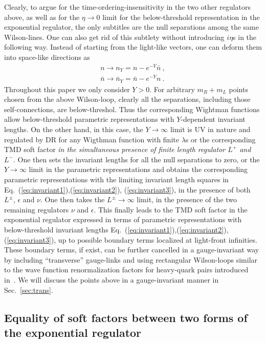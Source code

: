 \documentclass[a4paper,11pt]{article}
\begin{document}
Clearly, to argue for the time-ordering-insensitivity in the two other regulators above, as well as for the $\eta\rightarrow 0$ limit for the below-threshold representation in the exponential regulator, the only subtitles are the null separations among the same Wilson-lines. One can also get rid of this subtlety without introducing $i\eta$s in the following way. Instead of starting from the light-like vectors, one can deform them into space-like directions as~\cite{Collins:2004nx,Collins:2011zzd}
\begin{align}
n\rightarrow n_Y=n-e^{-Y}\bar n \ ,  \label{eq: spaceliken}\\
\bar n \rightarrow \bar n_Y=\bar n-e^{-Y} n \ .
\end{align}
Throughout this paper we only consider $Y>0$. For arbitrary $m_R+m_L$ points chosen from the above Wilson-loop, clearly all the separations, including those self-connections, are below-threshol. Thus the corresponding Wightman functions allow below-threshold parametric representations with $Y$-dependent invariant lengths. On the other hand, in this case, the $Y\rightarrow \infty$ limit is UV in nature and regulated by DR for any Wigthman function with finite $\lambda$s or the corresponding TMD soft factor {\it in the simultaneous presence of finite length regulator $L^+$ and $L^-$}. One then sets the invariant lengths for all the null separations to zero, or the $Y\rightarrow \infty$ limit in the parametric representations and obtains the corresponding parametric representations with the limiting invariant length squares in Eq.~(\ref{eq:invariant1}),(\ref{eq:invariant2}), (\ref{eq:invariant3}), in the presence of both $L^{\pm}$, $\epsilon$ and $\nu$. One then takes the $L^{\pm} \rightarrow \infty$ limit, in the presence of the two remaining regulators $\nu$ and $\epsilon$. This finally leads to the TMD soft factor in the exponential regulator expressed in terms of parametric representations with below-threshold invariant lengths Eq.~(\ref{eq:invariant1}),(\ref{eq:invariant2}), (\ref{eq:invariant3}), up to possible boundary terms localized at light-front infinities. These boundary terms, if exist, can be further cancelled in a gauge-invariant way by including ``transverse'' gauge-links and using rectangular Wilson-loops similar to the wave function renormalization factors for heavy-quark pairs introduced in~\cite{Collins:2008ht,Ji:2018hvs,Ji:2019ewn,Ji:2019sxk}. We will discuss the points above in a gauge-invariant manner in Sec.~\ref{sec:trans}. 

\subsection{Equality of soft factors between two forms of the exponential regulator}\label{sec:equality1}
\end{document}
